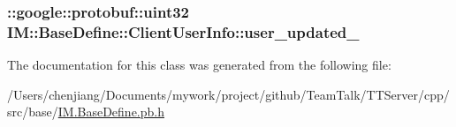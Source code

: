 \subsubsection[{user\+\_\+updated\+\_\+}]{\setlength{\rightskip}{0pt plus 5cm}\+::google\+::protobuf\+::uint32 I\+M\+::\+Base\+Define\+::\+Client\+User\+Info\+::user\+\_\+updated\+\_\+\hspace{0.3cm}{\ttfamily [private]}}\label{class_i_m_1_1_base_define_1_1_client_user_info_acbc2c96a99cf041db139b2a9e7143e1c}


The documentation for this class was generated from the following file\+:\begin{DoxyCompactItemize}
\item 
/\+Users/chenjiang/\+Documents/mywork/project/github/\+Team\+Talk/\+T\+T\+Server/cpp/src/base/\hyperlink{_i_m_8_base_define_8pb_8h}{I\+M.\+Base\+Define.\+pb.\+h}\end{DoxyCompactItemize}
